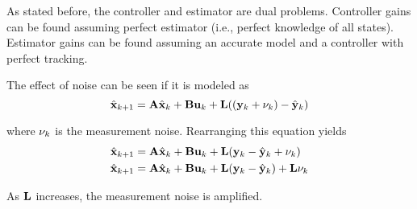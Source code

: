 As stated before, the controller and estimator are dual problems. Controller
gains can be found assuming perfect estimator (i.e., perfect knowledge of all
\glspl{state}). Estimator gains can be found assuming an accurate \gls{model}
and a controller with perfect \gls{tracking}.

The effect of noise can be seen if it is modeled
 as
\begin{equation*}
  \hat{\mathbf{x}}_{k+1} = \mathbf{A}\hat{\mathbf{x}}_k + \mathbf{B}\mathbf{u}_k +
    \mathbf{L} ((\mathbf{y}_k + \mathbf{\nu}_k) - \hat{\mathbf{y}}_k) \\
\end{equation*}

where $\mathbf{\nu}_k$ is the measurement noise. Rearranging this equation yields
\begin{align*}
  \hat{\mathbf{x}}_{k+1} &= \mathbf{A}\hat{\mathbf{x}}_k + \mathbf{B}\mathbf{u}_k +
    \mathbf{L} (\mathbf{y}_k - \hat{\mathbf{y}}_k + \mathbf{\nu}_k) \\
  \hat{\mathbf{x}}_{k+1} &= \mathbf{A}\hat{\mathbf{x}}_k + \mathbf{B}\mathbf{u}_k +
    \mathbf{L} (\mathbf{y}_k - \hat{\mathbf{y}}_k) + \mathbf{L}\mathbf{\nu}_k
\end{align*}

As $\mathbf{L}$ increases, the measurement noise is amplified.
